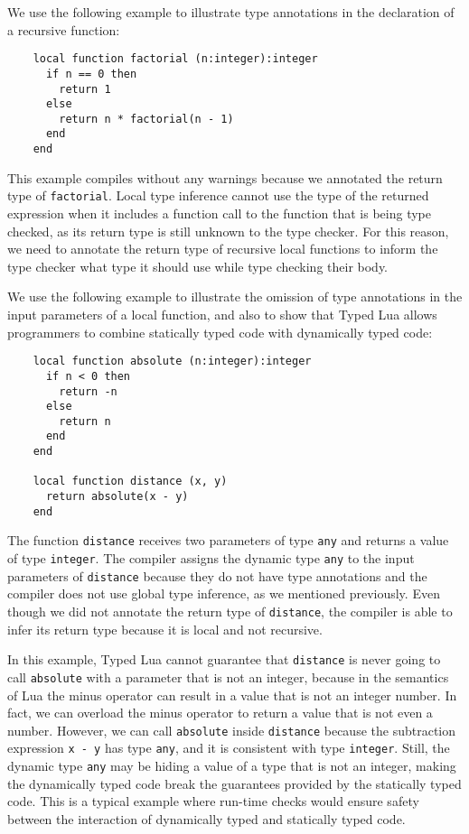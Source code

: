 We use the following example to illustrate type annotations in the
declaration of a recursive function:
\begin{verbatim}
    local function factorial (n:integer):integer
      if n == 0 then
        return 1
      else
        return n * factorial(n - 1)
      end
    end
\end{verbatim}

This example compiles without any warnings because we annotated
the return type of \texttt{factorial}.
Local type inference cannot use the type of the returned
expression when it includes a function call to the function that is
being type checked, as its return type is still unknown to the type checker.
For this reason, we need to annotate the return type of
recursive local functions to inform the type checker what type
it should use while type checking their body.

We use the following example to illustrate the omission of type
annotations in the input parameters of a local function,
and also to show that Typed Lua allows programmers to combine
statically typed code with dynamically typed code:
\begin{verbatim}
    local function absolute (n:integer):integer
      if n < 0 then
        return -n
      else
        return n
      end
    end

    local function distance (x, y)
      return absolute(x - y)
    end
\end{verbatim}

The function \texttt{distance} receives two parameters of type \texttt{any}
and returns a value of type \texttt{integer}.
The compiler assigns the dynamic type \texttt{any} to the input
parameters of \texttt{distance} because they do not have type annotations
and the compiler does not use global type inference, as we mentioned
previously.
Even though we did not annotate the return type of \texttt{distance},
the compiler is able to infer its return type because it is local
and not recursive.

In this example, Typed Lua cannot guarantee that \texttt{distance} is never
going to call \texttt{absolute} with a parameter that is not an integer,
because in the semantics of Lua the minus operator can result in a
value that is not an integer number.
In fact, we can overload the minus operator to return a value that is
not even a number.
However, we can call \texttt{absolute} inside \texttt{distance}
because the subtraction expression \texttt{x - y} has type \texttt{any},
and it is consistent with type \texttt{integer}.
Still, the dynamic type \texttt{any} may be hiding a value of a type
that is not an integer, making the dynamically typed code break the
guarantees provided by the statically typed code.
This is a typical example where run-time checks would ensure safety
between the interaction of dynamically typed and statically typed code.

